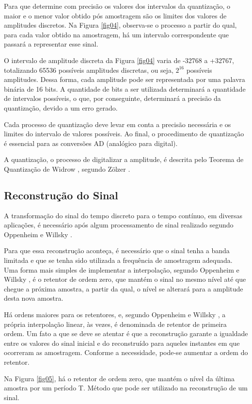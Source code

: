 Para que determine com precisão os valores dos intervalos da quantização, o maior e o menor valor obtido pós amostragem são os limites dos valores de amplitudes discretos. Na Figura \ref{fig04}, observa-se o processo a partir do qual, para cada valor obtido na amostragem, há um intervalo correspondente que passará a representar esse sinal. \par O intervalo de amplitude discreta da Figura \ref{fig04} varia de -32768 a +32767, totalizando 65536 possíveis amplitudes discretas, ou seja, $2^{16}$ possíveis amplitudes. Dessa forma, cada amplitude pode ser representada por uma palavra binária de 16 bits. A quantidade de bits a ser utilizada determinará a quantidade de intervalos possíveis, o que, por conseguinte, determinará a precisão da quantização, devido a um erro gerado.\par Cada processo de quantização deve levar em conta a precisão necessária e os limites do intervalo de valores possíveis. Ao final, o procedimento de quantização é essencial para as conversões AD (analógico para digital).

A quantização, o processo de digitalizar a amplitude, é descrita pelo Teorema de Quantização de Widrow \cite{widrow}, segundo  Zölzer \cite{zolzer2008digital}.

\subsection{Reconstrução do Sinal}
A transformação do sinal do tempo discreto para o tempo contínuo, em diversas aplicações, é necessário após algum processamento de sinal realizado segundo Oppenheim e Willsky \cite{oppenheim2010sinais}.
\par
Para que essa reconstrução aconteça, é necessário que o sinal tenha a banda limitada e que se tenha sido utilizada a frequência de amostragem adequada. Uma forma mais simples de implementar a interpolação, segundo Oppenheim e Willsky \cite{oppenheim2010sinais}, é o retentor de ordem zero, que mantém o sinal no mesmo nível até que chegue a próxima amostra, a partir da qual, o nível se alterará para a amplitude desta nova amostra.
\par
Há ordens maiores para os retentores, e, segundo Oppenheim e Willsky \cite{oppenheim2010sinais}, a própria interpolação linear, às vezes, é denominada de retentor de primeira ordem. Um fato a que se deve se atentar é que a reconstrução garante a igualdade entre os valores do sinal inicial e do reconstruído para aqueles instantes em que ocorreram as amostragem.  Conforme a necessidade, pode-se aumentar a ordem do retentor.
\par
Na Figura \ref{fig05}, há o retentor de ordem zero, que mantém o nível da última amostra por um período T. Método que pode ser utilizado na reconstrução de um sinal.

